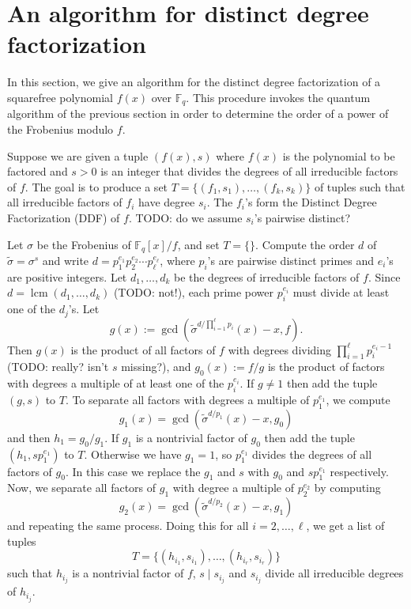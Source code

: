 \documentclass[12pt]{article}
\theoremstyle{plain}
\theoremstyle{definition}
\DeclareMathOperator{\lcm}{lcm} %
\def\F{\ensuremath{\mathbb{F}}}
\begin{document}

\section{An algorithm for distinct degree factorization}

In this section, we give an algorithm for the distinct degree
factorization of a squarefree polynomial $f(x)$ over $\F_q$. This
procedure invokes the quantum algorithm of the previous section in
order to determine the order of a power of the Frobenius modulo $f$.

Suppose we are given a tuple $(f(x), s)$ where $f(x)$ is the
polynomial to be factored and $s > 0$ is an integer that divides the
degrees of all irreducible factors of $f$. The goal is to produce a
set $T = \{ (f_1, s_1), \dots, (f_k, s_k) \}$ of tuples such that all
irreducible factors of $f_i$ have degree $s_i$. The $f_i$'s form the
Distinct Degree Factorization (DDF) of $f$. TODO: do we assume $s_i$'s
pairwise distinct?

Let $\sigma$ be the Frobenius of $\F_q[x] / f$, and set $T =
\{\}$. Compute the order $d$ of $\tilde{\sigma} = \sigma^s$ and write
$d = p_1^{e_1} p_2^{e_2} \cdots p_\ell^{e_\ell}$, where $p_i$'s are
pairwise distinct primes and $e_i$'s are positive integers. Let $d_1, \dots,
d_k$ be the degrees of irreducible factors of $f$. Since $d =
\lcm(d_1, \dots, d_k)$ (TODO: not!), each prime power $p_i^{e_i}$ must divide at
least one of the $d_j$'s. Let
\[ g(x) := \gcd(\tilde{\sigma}^{d / \prod_{i = 1}^\ell p_i}(x) - x, f). \]
Then $g(x)$ is the product of all factors of $f$ with degrees dividing $\prod_{i = 1}^\ell p_i^{e_i 
- 1}$ (TODO: really? isn't $s$ missing?), and $g_0(x) := f / g$ is the product of factors with degrees a multiple of at least one of 
the $p_i^{e_i}$. If $g \ne 1$ then add the tuple $(g, s)$ to $T$. To separate all factors with 
degrees a multiple of $p_1^{e_1}$, we compute
\[ g_1(x) = \gcd(\tilde{\sigma}^{d / p_1}(x) - x, g_0) \]
and then $h_1 = g_0 / g_1$. If $g_1$ is a nontrivial factor of $g_0$ then add the tuple $(h_1, 
sp_1^{e_1})$ to $T$. Otherwise we have $g_1 = 1$, so $p_1^{e_1}$ divides the degrees of all factors 
of $g_0$. In this case we replace the $g_1$ and $s$ with $g_0$ and $sp_1^{e_1}$ respectively. Now, 
we separate all factors of $g_1$ with degree a multiple of $p_2^{e_2}$ by computing
\[ g_2(x) = \gcd(\tilde{\sigma}^{d / p_2}(x) - x, g_1) \]
and repeating the same process. Doing this for all $i = 2, \dots, \ell$, we get a list of tuples
\begin{equation}
\label{equ:tuple}
	T = \{ (h_{i_1}, s_{i_1}), \dots, (h_{i_r}, s_{i_r}) \}
\end{equation}
such that $h_{i_j}$ is a nontrivial factor of $f$, $s \mid s_{i_j}$ and $s_{i_j}$ divide all 
irreducible degrees of $h_{i_j}$.
\end{document}
